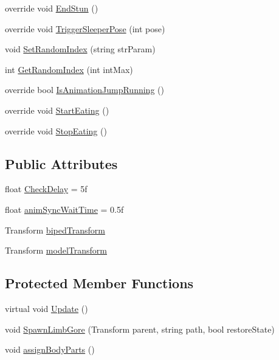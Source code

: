\begin{DoxyCompactItemize}
override void \mbox{\hyperlink{class_mecanim_s_d_x_a11702afc757547f73ba1543e807a2957}{End\+Stun}} ()
\item 
override void \mbox{\hyperlink{class_mecanim_s_d_x_abb807832f89cffba09a1669ddb33fed4}{Trigger\+Sleeper\+Pose}} (int pose)
\item 
void \mbox{\hyperlink{class_mecanim_s_d_x_aabbcbe845bba261cc773a988289ade7a}{Set\+Random\+Index}} (string str\+Param)
\item 
int \mbox{\hyperlink{class_mecanim_s_d_x_acea62037d362e9b31a79cde9d27424f0}{Get\+Random\+Index}} (int int\+Max)
\item 
override bool \mbox{\hyperlink{class_mecanim_s_d_x_adc5e56049f87610dfc59071c22d63718}{Is\+Animation\+Jump\+Running}} ()
\item 
override void \mbox{\hyperlink{class_mecanim_s_d_x_a0b9031ac24efb04678b8e11e40ddae5a}{Start\+Eating}} ()
\item 
override void \mbox{\hyperlink{class_mecanim_s_d_x_a6e5fb86facf2bb4622bc9a15e127a2bd}{Stop\+Eating}} ()
\end{DoxyCompactItemize}
\subsection*{Public Attributes}
\begin{DoxyCompactItemize}
\item 
float \mbox{\hyperlink{class_mecanim_s_d_x_a3f4c6d24e450ed9b34259f26b44bedac}{Check\+Delay}} = 5f
\item 
float \mbox{\hyperlink{class_mecanim_s_d_x_a708fb6d1c48407ed93961d2809315770}{anim\+Sync\+Wait\+Time}} = 0.\+5f
\item 
Transform \mbox{\hyperlink{class_mecanim_s_d_x_a0d39918c17be993e5ed59092a3344950}{biped\+Transform}}
\item 
Transform \mbox{\hyperlink{class_mecanim_s_d_x_a1898a330d8906da06f8006642aad5346}{model\+Transform}}
\end{DoxyCompactItemize}
\subsection*{Protected Member Functions}
\begin{DoxyCompactItemize}
\item 
virtual void \mbox{\hyperlink{class_mecanim_s_d_x_af4c9192fb629edf0821cf4eb551459cf}{Update}} ()
\item 
void \mbox{\hyperlink{class_mecanim_s_d_x_a97268113d10542bb47b9da96c0e094cb}{Spawn\+Limb\+Gore}} (Transform parent, string path, bool restore\+State)
\item 
void \mbox{\hyperlink{class_mecanim_s_d_x_a85b7de7f10f8aeb00e377cf3873e0501}{assign\+Body\+Parts}} ()
\end{DoxyCompactItemize}
